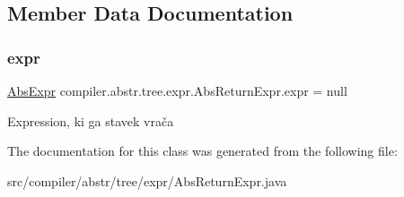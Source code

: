 \subsection{Member Data Documentation}
\mbox{\label{classcompiler_1_1abstr_1_1tree_1_1expr_1_1_abs_return_expr_a36d1a109ae9d447640d861844e5fc1c5}} 
\subsubsection{\texorpdfstring{expr}{expr}}
{\footnotesize\ttfamily \hyperlink{classcompiler_1_1abstr_1_1tree_1_1expr_1_1_abs_expr}{Abs\+Expr} compiler.\+abstr.\+tree.\+expr.\+Abs\+Return\+Expr.\+expr = null}

Expression, ki ga stavek vrača 

The documentation for this class was generated from the following file\+:\begin{DoxyCompactItemize}
\item 
src/compiler/abstr/tree/expr/Abs\+Return\+Expr.\+java\end{DoxyCompactItemize}
